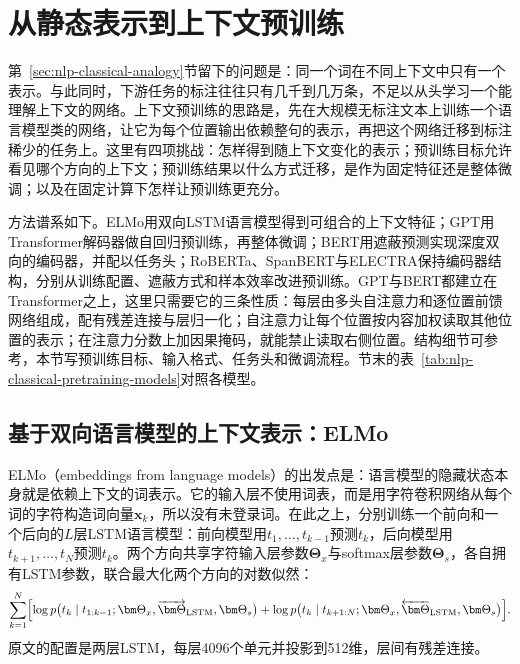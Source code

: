 \section{从静态表示到上下文预训练}
\label{sec:nlp-classical-contextual-pretraining}

第~\ref{sec:nlp-classical-analogy}节留下的问题是：同一个词在不同上下文中只有一个表示。与此同时，下游任务的标注往往只有几千到几万条，不足以从头学习一个能理解上下文的网络。上下文预训练的思路是，先在大规模无标注文本上训练一个语言模型类的网络，让它为每个位置输出依赖整句的表示，再把这个网络迁移到标注稀少的任务上。这里有四项挑战：怎样得到随上下文变化的表示；预训练目标允许看见哪个方向的上下文；预训练结果以什么方式迁移，是作为固定特征还是整体微调；以及在固定计算下怎样让预训练更充分。

方法谱系如下。ELMo用双向LSTM语言模型得到可组合的上下文特征；GPT用Transformer解码器做自回归预训练，再整体微调；BERT用遮蔽预测实现深度双向的编码器，并配以任务头；RoBERTa、SpanBERT与ELECTRA保持编码器结构，分别从训练配置、遮蔽方式和样本效率改进预训练。GPT与BERT都建立在Transformer之上，这里只需要它的三条性质：每层由多头自注意力和逐位置前馈网络组成，配有残差连接与层归一化；自注意力让每个位置按内容加权读取其他位置的表示；在注意力分数上加因果掩码，就能禁止读取右侧位置。结构细节可参考，本节写预训练目标、输入格式、任务头和微调流程。节末的表~\ref{tab:nlp-classical-pretraining-models}对照各模型。

\subsection{基于双向语言模型的上下文表示：ELMo}
\label{sec:nlp-classical-elmo}

ELMo（embeddings from language models）的出发点是：语言模型的隐藏状态本身就是依赖上下文的词表示。它的输入层不使用词表，而是用字符卷积网络从每个词的字符构造词向量$\bm x_k$，所以没有未登录词。在此之上，分别训练一个前向和一个后向的$L$层LSTM语言模型：前向模型用$t_1,\ldots,t_{k-1}$预测$t_k$，后向模型用$t_{k+1},\ldots,t_N$预测$t_k$。两个方向共享字符输入层参数$\bm\Theta_x$与softmax层参数$\bm\Theta_s$，各自拥有LSTM参数，联合最大化两个方向的对数似然：
\[
  \sum_{k=1}^{N}\Bigl[\log p\bigl(t_k\mid t_{1:k-1};\bm\Theta_x,\overrightarrow{\bm\Theta}_{\mathrm{LSTM}},\bm\Theta_s\bigr)
  +\log p\bigl(t_k\mid t_{k+1:N};\bm\Theta_x,\overleftarrow{\bm\Theta}_{\mathrm{LSTM}},\bm\Theta_s\bigr)\Bigr].
\]
原文的配置是两层LSTM，每层4096个单元并投影到512维，层间有残差连接。

